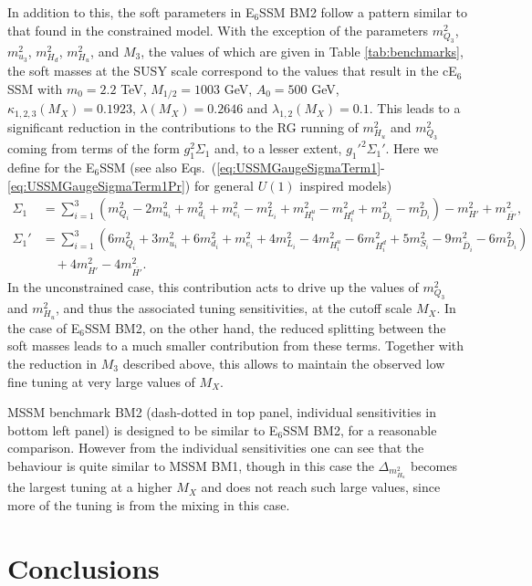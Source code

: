 \documentclass[preprint,amsmath,amssymb,aps,superscriptaddress,prd,
showpacs,floatfix,nofootinbib]{revtex4-1}
\begin{document}
In addition to this, the soft parameters in E$_6$SSM BM2 follow a pattern
similar to that found in the constrained model.  With the exception of the
parameters $m_{Q_3}^2$, $m_{u_3}^2$, $m_{H_d}^2$, $m_{H_u}^2$, and $M_3$,
the values of which are given in Table \ref{tab:benchmarks}, the soft masses
at the SUSY scale correspond to the values that result in the cE$_6$SSM with
$m_0 = 2.2$ TeV, $M_{1/2} = 1003$ GeV, $A_0 = 500$ GeV,
$\kappa_{1,2,3}(M_X) = 0.1923$, $\lambda(M_X) = 0.2646$ and
$\lambda_{1,2}(M_X) = 0.1$.  This leads to a significant reduction in the
contributions to the RG running of $m_{H_u}^2$ and $m_{Q_3}^2$ coming from
terms of the form $g_1^2\Sigma_1$ and, to a lesser extent, $g_1'^2\Sigma_1'$.
Here we define for the E$_6$SSM (see also
Eqs.~(\ref{eq:USSMGaugeSigmaTerm1}-\ref{eq:USSMGaugeSigmaTerm1Pr}) for
general $U(1)$ inspired models)
\begin{align*}
\Sigma_1 &= \sum_{i=1}^3 \left ( m_{Q_i}^2 - 2 m_{u_i}^2 + m_{d_i}^2 +
m_{e_i}^2 - m_{L_i}^2 + m_{H_i^u}^2 - m_{H_i^d}^2 + m_{\overline{D}_i}^2
- m_{D_i}^2 \right ) -m_{H'}^2 + m_{\overline{H'}}^2 , \\
\Sigma_1' &= \sum_{i=1}^3 \left ( 6 m_{Q_i}^2 + 3 m_{u_i}^2 + 6 m_{d_i}^2
+ m_{e_i}^2 + 4 m_{L_i}^2 - 4 m_{H_i^u}^2 - 6 m_{H_i^d}^2 + 5 m_{S_i}^2
- 9 m_{\overline{D}_i}^2 - 6 m_{D_i}^2 \right ) \\
& \quad {} + 4 m_{H'}^2 - 4 m_{\overline{H'}}^2 .
\end{align*}
In the unconstrained case, this contribution acts to drive up the values of
$m_{Q_3}^2$ and $m_{H_u}^2$, and thus the associated tuning sensitivities,
at the cutoff scale $M_X$.  In the case of E$_6$SSM BM2, on the other hand,
the reduced splitting between the soft masses leads to a much smaller
contribution from these terms.  Together with the reduction in $M_3$ described
above, this allows to maintain the observed low fine tuning at very large
values of $M_X$.

MSSM benchmark BM2 (dash-dotted in top panel, individual sensitivities in
bottom left panel) is designed to be similar to E$_6$SSM BM2, for a reasonable
comparison.  However from the individual sensitivities one can see that the
behaviour is quite similar to MSSM BM1, though in this case the
$\Delta_{m_{H_u}^2}$ becomes the largest tuning at a higher $M_X$ and does not
reach such large values, since more of the tuning is from the mixing in this
case.

\section{\label{sec:conclusion}Conclusions}
\end{document}
